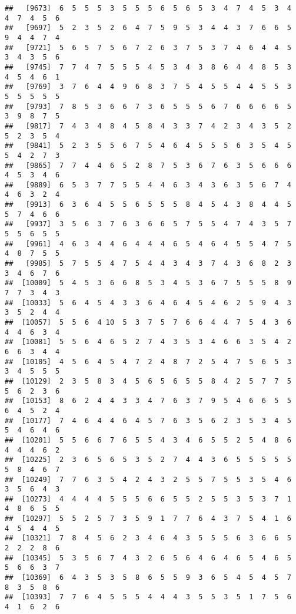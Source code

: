 \documentclass[
]{book}
\begin{document}
\begin{verbatim}
##   [9673]  6  5  5  5  3  5  5  5  6  5  6  5  3  4  7  4  5  3  4  4  7  4  5  6
##   [9697]  5  2  3  5  2  6  4  7  5  9  5  3  4  4  3  7  6  6  5  9  4  4  7  4
##   [9721]  5  6  5  7  5  6  7  2  6  3  7  5  3  7  4  6  4  4  5  3  4  3  5  6
##   [9745]  7  7  4  7  5  5  5  4  5  3  4  3  8  6  4  4  8  5  3  4  5  4  6  1
##   [9769]  3  7  6  4  4  9  6  8  3  7  5  4  5  5  4  4  5  5  3  5  5  5  5  5
##   [9793]  7  8  5  3  6  6  7  3  6  5  5  5  6  7  6  6  6  6  5  3  9  8  7  5
##   [9817]  7  4  3  4  8  4  5  8  4  3  3  7  4  2  3  4  3  5  2  5  2  3  5  4
##   [9841]  5  2  3  5  5  6  7  5  4  6  4  5  5  5  6  3  5  4  5  5  4  2  7  3
##   [9865]  7  7  4  4  6  5  2  8  7  5  3  6  7  6  3  5  6  6  6  4  5  3  4  6
##   [9889]  6  5  3  7  7  5  5  4  4  6  3  4  3  6  3  5  6  7  4  4  6  3  2  4
##   [9913]  6  3  6  4  5  5  6  5  5  5  8  4  5  4  3  8  4  4  5  5  7  4  6  6
##   [9937]  3  5  6  3  7  6  3  6  6  5  7  5  5  4  7  4  3  5  7  5  5  6  5  5
##   [9961]  4  6  3  4  4  6  4  4  4  6  5  4  6  4  5  5  4  7  5  4  8  7  5  5
##   [9985]  5  7  5  5  4  7  5  4  4  3  4  3  7  4  3  6  8  2  3  3  4  6  7  6
##  [10009]  5  4  5  3  6  6  8  5  3  4  5  3  6  7  5  5  5  8  9  7  7  3  4  3
##  [10033]  5  6  4  5  4  3  3  6  4  6  4  5  4  6  2  5  9  4  3  3  5  2  4  4
##  [10057]  5  5  6  4 10  5  3  7  5  7  6  6  4  4  7  5  4  3  6  4  4  6  3  4
##  [10081]  5  5  6  4  6  5  2  7  4  3  5  3  4  6  6  3  5  4  2  6  6  3  4  4
##  [10105]  4  5  6  4  5  4  7  2  4  8  7  2  5  4  7  5  6  5  3  3  4  5  5  5
##  [10129]  2  3  5  8  3  4  5  6  5  6  5  5  8  4  2  5  7  7  5  5  6  2  3  6
##  [10153]  8  6  2  4  4  3  3  4  7  6  3  7  9  5  4  6  6  5  5  6  4  5  2  4
##  [10177]  7  4  6  4  4  6  4  5  7  6  3  5  6  2  3  5  3  4  5  5  4  6  4  6
##  [10201]  5  5  6  6  7  6  5  5  4  3  4  6  5  5  2  5  4  8  6  4  4  4  6  2
##  [10225]  2  3  6  5  6  5  3  5  2  7  4  4  3  6  5  5  5  5  5  5  8  4  6  7
##  [10249]  7  7  6  3  5  4  2  4  3  2  5  5  7  5  5  3  5  4  6  3  5  6  4  3
##  [10273]  4  4  4  4  5  5  5  6  6  5  5  2  5  5  3  5  3  7  1  4  8  6  5  5
##  [10297]  5  5  2  5  7  3  5  9  1  7  7  6  4  3  7  5  4  1  6  4  5  4  4  5
##  [10321]  7  8  4  5  6  2  3  4  6  4  3  5  5  5  6  3  6  6  5  2  2  2  8  6
##  [10345]  5  3  5  6  7  4  3  2  6  5  6  4  6  4  6  5  4  6  5  5  6  6  3  7
##  [10369]  6  4  3  5  3  5  8  6  5  5  9  3  6  5  4  5  4  5  7  8  3  5  8  6
##  [10393]  7  7  6  4  5  5  5  4  4  4  3  5  5  3  5  1  7  5  6  4  1  6  2  6

\end{verbatim}
\end{document}
